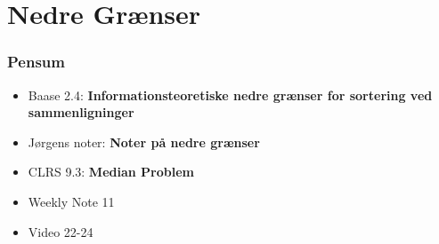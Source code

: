 \section{Nedre Grænser}%
\label{sec:nedregrænser}

\begin{frame}
	\frametitle{Pensum}
	\begin{itemize}
		\item Baase 2.4: \textbf{Informationsteoretiske nedre grænser for sortering ved sammenligninger}
		\item Jørgens noter: \textbf{Noter på nedre grænser}
		\item CLRS 9.3: \textbf{Median Problem}
		\item Weekly Note 11
		\item Video 22-24
	\end{itemize}
\end{frame}

